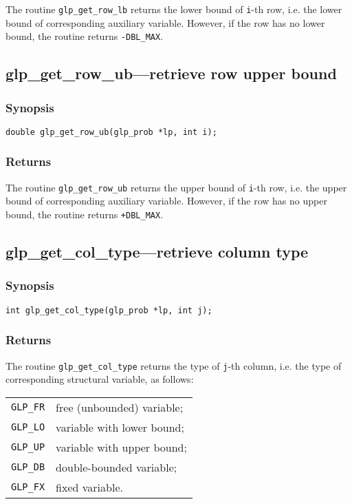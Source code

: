 The routine \verb|glp_get_row_lb| returns the lower bound of
\verb|i|-th row, i.e. the lower bound of corresponding auxiliary
variable. However, if the row has no lower bound, the routine returns
\verb|-DBL_MAX|.

\subsection{glp\_get\_row\_ub---retrieve row upper bound}

\subsubsection*{Synopsis}

\begin{verbatim}
double glp_get_row_ub(glp_prob *lp, int i);
\end{verbatim}

\subsubsection*{Returns}

The routine \verb|glp_get_row_ub| returns the upper bound of
\verb|i|-th row, i.e. the upper bound of corresponding auxiliary
variable. However, if the row has no upper bound, the routine returns
\verb|+DBL_MAX|.

\subsection{glp\_get\_col\_type---retrieve column type}

\subsubsection*{Synopsis}

\begin{verbatim}
int glp_get_col_type(glp_prob *lp, int j);
\end{verbatim}

\subsubsection*{Returns}

The routine \verb|glp_get_col_type| returns the type of \verb|j|-th
column, i.e. the type of corresponding structural variable, as follows:

\begin{tabular}{@{}ll}
\verb|GLP_FR| & free (unbounded) variable; \\
\verb|GLP_LO| & variable with lower bound; \\
\verb|GLP_UP| & variable with upper bound; \\
\verb|GLP_DB| & double-bounded variable; \\
\verb|GLP_FX| & fixed variable. \\
\end{tabular}

